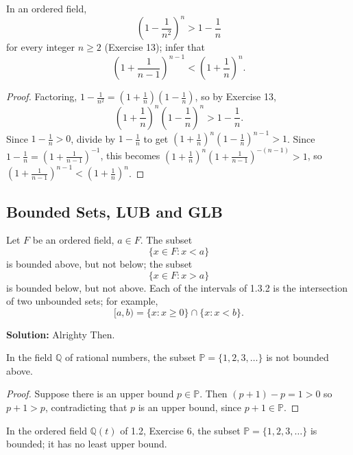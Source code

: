 \begin{tcolorbox}[title=Problem 20, breakable]
    In an ordered field,
    \[\left( 1 - \frac{1}{n^2} \right)^n > 1 - \frac{1}{n}\]
    for every integer $n \ge 2$ (Exercise 13); infer that 
    \[\left( 1 + \frac{1}{n - 1} \right)^{n - 1} < \left(1 + \frac{1}{n}\right)^n.\]
\end{tcolorbox}

\begin{proof}
    Factoring, $1 - \frac{1}{n^2} = \left(1+\frac1n\right)\left(1-\frac1n\right)$, so by Exercise 13,
    \[\left(1+\frac1n\right)^n\left(1-\frac1n\right)^n > 1 - \frac1n.\]
    Since $1 - \frac1n > 0$, divide by $1 - \frac1n$ to get
        $\left(1+\frac1n\right)^n\left(1-\frac1n\right)^{n-1} > 1$.
    Since $1 - \frac1n = \left(1+\frac1{n-1}\right)^{-1}$, this becomes
        $\left(1+\frac1n\right)^n\left(1+\frac1{n-1}\right)^{-(n-1)} > 1$,
        so $\left(1+\frac1{n-1}\right)^{n-1} < \left(1+\frac1n\right)^n$.
\end{proof}

\subsection{Bounded Sets, LUB and GLB}

\begin{tcolorbox}[title=Problem 1, breakable]
    Let $F$ be an ordered field, $a \in F$. The subset 
    \[\{x \in F : x < a\}\]
    is bounded above, but not below; the subset 
    \[\{x \in F : x > a\}\]
    is bounded below, but not above. Each of the intervals of 1.3.2
    is the intersection of two unbounded sets; for example,
    \[[a, b) = \{x : x \ge 0\} \cap \{x : x < b\}.\]
\end{tcolorbox}

\textbf{Solution: } Alrighty Then.

\begin{tcolorbox}[title=Problem 2, breakable]
    In the field $\mathbb{Q}$ of rational numbers,
    the subset $\mathbb{P} = \{1, 2, 3, \ldots\}$ is not bounded above.
\end{tcolorbox}

\begin{proof}
    Suppose there is an upper bound $p \in \mathbb{P}$.
    Then $(p + 1) - p = 1 > 0$ so $p + 1 > p$, contradicting that $p$ is an upper bound,
        since $p + 1 \in \mathbb{P}$.
\end{proof}

\newpage
\begin{tcolorbox}[title=Problem 3, breakable]
    In the ordered field $\mathbb{Q}(t)$ of 1.2, Exercise 6, the subset 
    $\mathbb{P} = \{1, 2, 3, \ldots\}$ is bounded; it has no least upper bound.
\end{tcolorbox}

